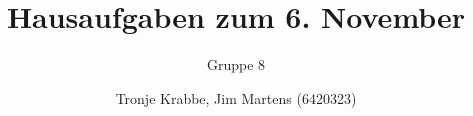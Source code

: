 \documentclass[10pt,a4paper,oneside,ngerman,numbers=noenddot]{scrartcl}
\begin{document}
\author{Tronje Krabbe, Jim Martens (6420323)}
\title{Hausaufgaben zum 6. November}
\subtitle{Gruppe 8}
\maketitle
\section{} %
	\subsection{} %
	\subsection{} %
	\subsection{} %
	\subsection{} %
\section{} %
	\subsection{} %
	\subsection{} %
	\subsection{} %
	\subsection{} %
	\subsection{} %
\section{} %
	\subsection{} %
	\subsection{} %
\end{document}
